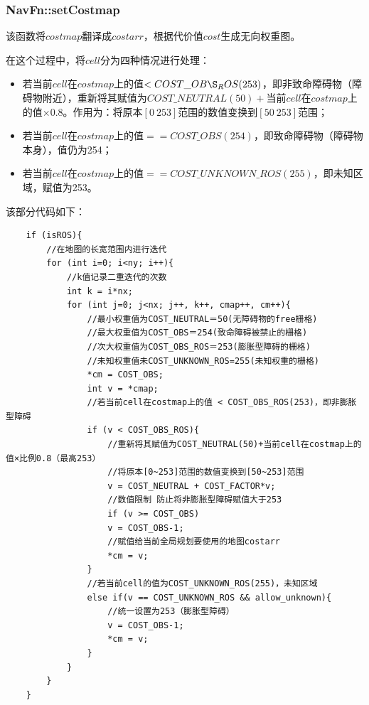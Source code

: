 \documentclass[9pt, oneside]{book}
\begin{document}
\subsubsection{NavFn::setCostmap}

该函数将$costmap$翻译成$costarr$，根据代价值$cost$生成无向权重图。

在这个过程中，将$cell$分为四种情况进行处理：
\begin{itemize}
    \item 若当前$cell$在$costmap$上的值$<COST\_OB\S_ROS(253)$，即非致命障碍物（障碍物附近），重新将其赋值为$COST\_NEUTRAL(50)+$当前$cell$在$costmap$上的值$×0.8$。作用为：将原本$[0~253]$范围的数值变换到$[50~253]$范围；
    \item 若当前$cell$在$costmap$上的值$== COST\_OBS(254)$，即致命障碍物（障碍物本身），值仍为254；
    \item 若当前$cell$在$costmap$上的值$== COST\_UNKNOWN\_ROS(255)$，即未知区域，赋值为253。
\end{itemize}

该部分代码如下：

\small
\begin{verbatim}
    if (isROS){
        //在地图的长宽范围内进行迭代
        for (int i=0; i<ny; i++){
            //k值记录二重迭代的次数
            int k = i*nx;
            for (int j=0; j<nx; j++, k++, cmap++, cm++){
                //最小权重值为COST_NEUTRAL＝50(无障碍物的free栅格)
                //最大权重值为COST_OBS＝254(致命障碍被禁止的栅格)
                //次大权重值为COST_OBS_ROS＝253(膨胀型障碍的栅格)
                //未知权重值未COST_UNKNOWN_ROS=255(未知权重的栅格)
                *cm = COST_OBS;
                int v = *cmap;
                //若当前cell在costmap上的值 < COST_OBS_ROS(253)，即非膨胀型障碍
                if (v < COST_OBS_ROS){
                    //重新将其赋值为COST_NEUTRAL(50)+当前cell在costmap上的值×比例0.8（最高253）
                    //将原本[0~253]范围的数值变换到[50~253]范围
                    v = COST_NEUTRAL + COST_FACTOR*v;
                    //数值限制 防止将非膨胀型障碍赋值大于253 
                    if (v >= COST_OBS)
                    v = COST_OBS-1;
                    //赋值给当前全局规划要使用的地图costarr
                    *cm = v;
                }
                //若当前cell的值为COST_UNKNOWN_ROS(255)，未知区域
                else if(v == COST_UNKNOWN_ROS && allow_unknown){
                    //统一设置为253（膨胀型障碍）
                    v = COST_OBS-1;
                    *cm = v;
                }
            }
        }
    }
\end{verbatim}
\normalsize
\end{document}
